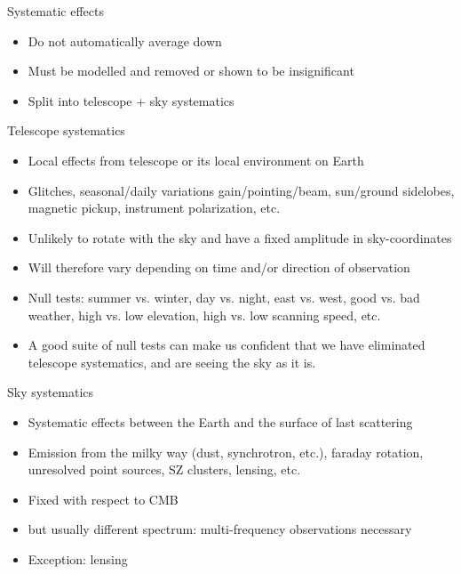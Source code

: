 \documentclass{beamer}
\begin{document}
\begin{frame}{Systematic effects}
	\begin{itemize}
		\item Do not automatically average down
		\item Must be modelled and removed or shown to be insignificant
		\item Split into telescope + sky systematics
	\end{itemize}
\end{frame}

\begin{frame}{Telescope systematics}
	\begin{itemize}
		\item Local effects from telescope or its local environment on Earth
		\item Glitches, seasonal/daily variations gain/pointing/beam, sun/ground sidelobes,
			magnetic pickup, instrument polarization, etc.
		\item Unlikely to rotate with the sky and have a fixed amplitude in sky-coordinates
		\item Will therefore vary depending on time and/or direction of observation
		\item Null tests: summer vs. winter, day vs. night, east vs. west, good vs. bad
			weather, high vs. low elevation, high vs. low scanning speed, etc.
		\item A good suite of null tests can make us confident that we have eliminated
			telescope systematics, and are seeing the sky as it is.
	\end{itemize}
\end{frame}

\begin{frame}{Sky systematics}
	\begin{itemize}
		\item Systematic effects between the Earth and the surface of last scattering
		\item Emission from the milky way (dust, synchrotron, etc.), faraday rotation,
			unresolved point sources, SZ clusters, lensing, etc.
		\item Fixed with respect to CMB
		\item but usually different spectrum: multi-frequency observations necessary
		\item Exception: lensing
	\end{itemize}
\end{frame}
\end{document}
